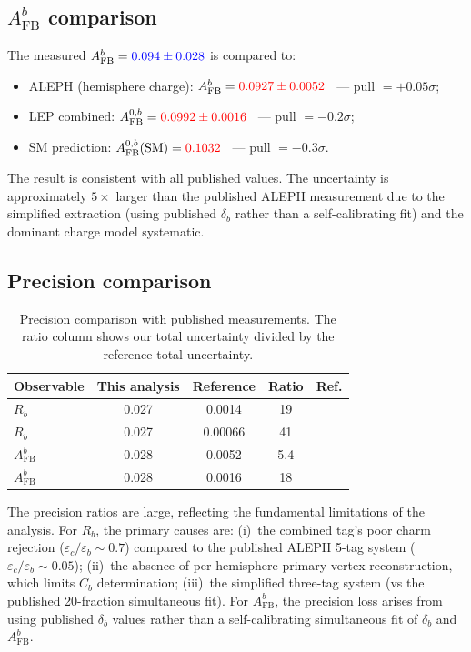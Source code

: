 \documentclass[11pt,a4paper]{article}
\newcommand{\measured}[1]{\textcolor{blue}{#1}}
\newcommand{\external}[1]{\textcolor{red}{#1}}
\begin{document}
\subsection{$A_\mathrm{FB}^b$ comparison}

The measured $A_\mathrm{FB}^b = \measured{0.094 \pm 0.028}$ is compared to:
\begin{itemize}
\item ALEPH (hemisphere charge): $A_\mathrm{FB}^b = \external{0.0927 \pm 0.0052}$~\cite{ALEPH:AFBb} --- pull $= +0.05\sigma$;
\item LEP combined: $A_\mathrm{FB}^{0,b} = \external{0.0992 \pm 0.0016}$~\cite{LEP:EWWG:2005} --- pull $= -0.2\sigma$;
\item SM prediction: $A_\mathrm{FB}^{0,b}(\mathrm{SM}) = \external{0.1032}$~\cite{LEP:EWWG:2005} --- pull $= -0.3\sigma$.
\end{itemize}

The result is consistent with all published values.  The uncertainty is
approximately $5\times$ larger than the published ALEPH measurement due
to the simplified extraction (using published $\delta_b$ rather than a
self-calibrating fit) and the dominant charge model systematic.

\subsection{Precision comparison}

\begin{table}[htbp]
\centering
\caption{Precision comparison with published measurements.  The ratio
  column shows our total uncertainty divided by the reference total
  uncertainty.}
\label{tbl:precision}
\begin{tabular}{lcccc}
\toprule
Observable & This analysis & Reference & Ratio & Ref. \\
\midrule
$R_b$ & 0.027 & 0.0014 & 19 & \cite{ALEPH:Rb:1996} \\
$R_b$ & 0.027 & 0.00066 & 41 & \cite{LEP:EWWG:2005} \\
$A_\mathrm{FB}^b$ & 0.028 & 0.0052 & 5.4 & \cite{ALEPH:AFBb} \\
$A_\mathrm{FB}^b$ & 0.028 & 0.0016 & 18 & \cite{LEP:EWWG:2005} \\
\bottomrule
\end{tabular}
\end{table}

The precision ratios are large, reflecting the fundamental limitations of
the analysis.  For $R_b$, the primary causes are:
(i)~the combined tag's poor charm rejection ($\varepsilon_c/\varepsilon_b
\sim 0.7$) compared to the published ALEPH 5-tag system
($\varepsilon_c/\varepsilon_b \sim 0.05$);
(ii)~the absence of per-hemisphere primary vertex reconstruction, which
limits $C_b$ determination;
(iii)~the simplified three-tag system (vs the published 20-fraction
simultaneous fit).  For $A_\mathrm{FB}^b$, the precision loss arises from
using published $\delta_b$ values rather than a self-calibrating
simultaneous fit of $\delta_b$ and $A_\mathrm{FB}^b$.
\end{document}
